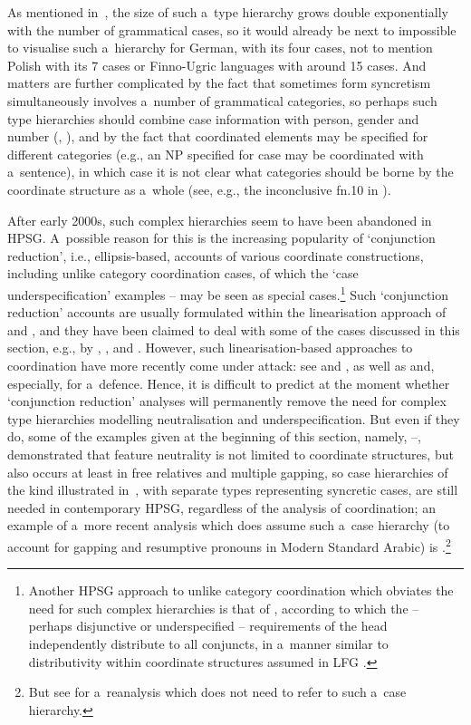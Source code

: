 \documentclass[output=paper]{langsci/langscibook}
\begin{document}
\z
As mentioned in~\citealt[225]{lev:pol:01}, the size of such a~type hierarchy grows double exponentially with the number of grammatical cases, so it would already be next to impossible to visualise such a~hierarchy for German, with its four cases, not to mention Polish with its 7 cases or Finno-Ugric languages with around 15 cases.  And matters are further complicated by the fact that sometimes form syncretism simultaneously involves a~number of grammatical categories, so perhaps such type hierarchies should combine case information with person, gender and number (\citealt[145]{dani:01}, \citealt{Crysmann2005c}), and by the fact that coordinated elements may be specified for different categories (e.g., an NP specified for case may be coordinated with a~sentence), in which case it is not clear what categories should be borne by the coordinate structure as a~whole (see, e.g., the inconclusive fn.10 in \citealt[277]{sag:02}).

After early 2000s, such complex  hierarchies seem to have been abandoned in HPSG\@.  A~possible reason for this is the increasing popularity of `conjunction reduction’, i.e., ellipsis-based, accounts of various coordinate constructions, including unlike category coordination cases, of which the `case underspecification’ examples – may be seen as special cases.\footnote{Another HPSG approach to unlike category coordination which obviates the need for such complex hierarchies is that of \citealt{yata:04}, according to which the – perhaps disjunctive or underspecified – requirements of the head independently distribute to all conjuncts, in a~manner similar to distributivity within coordinate structures assumed in LFG \citep{DK2000a,dal:kin:sad:09,prz:pat:12a}.}  Such `conjunction reduction’ accounts are usually formulated within the linearisation approach of \citealt{Reape92a,Reape94a} and \citealt{Kathol95a}, and they have been claimed to deal with some of the cases discussed in this section, e.g., by \citealt{Crysmann2003c}, \citealt{BS2004a}, and \citealt{chav:06,chav:08}.  However, such linearisation-based approaches to coordination have more recently come under attack: see \citealt{levi:11} and \citealt{kub:lev:15}, as well as \citealt{yata:12,yata:16} and, especially, \citealt{yat:wai:18} for a~defence.  Hence, it is difficult to predict at the moment whether `conjunction reduction’ analyses will permanently remove the need for complex type hierarchies modelling neutralisation and underspecification.  But even if they do, some of the examples given at the beginning of this section, namely, –, demonstrated that feature neutrality is not limited to coordinate structures, but also occurs at least in free relatives and multiple gapping, so case hierarchies of the kind illustrated in~, with separate types representing syncretic cases, are still needed in contemporary HPSG, regardless of the analysis of coordination; an example of a~more recent analysis which does assume such a~case hierarchy (to account for gapping and resumptive pronouns in Modern Standard Arabic) is \citealt{AB2013a-u}.\footnote{But see \citealt{crys:17} for a~reanalysis which does not need to refer to such a~case hierarchy.}
\end{document}
